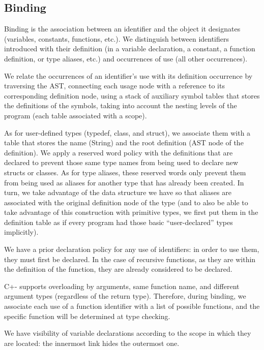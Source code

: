 \documentclass[10pt,a4paper]{article}
\begin{document}
\subsection{Binding}
\label{subsec:Binding}
Binding is the association between an identifier and the object it designates (variables, constants, functions, etc.). We distinguish between identifiers introduced with their definition (in a variable declaration, a constant, a function definition, or type aliases, etc.) and occurrences of use (all other occurrences).


We relate the occurrences of an identifier's use with its definition occurrence by traversing the AST, connecting each usage node with a reference to its corresponding definition node, using a stack of auxiliary symbol tables that stores the definitions of the symbols, taking into account the nesting levels of the program (each table associated with a scope).

As for user-defined types (typedef, class, and struct), we associate them with a table that stores the name (String) and the root definition (AST node of the definition). We apply a reserved word policy with the definitions that are declared to prevent those same type names from being used to declare new structs or classes. As for type aliases, these reserved words only prevent them from being used as aliases for another type that has already been created. In turn, we take advantage of the data structure we have so that aliases are associated with the original definition node of the type (and to also be able to take advantage of this construction with primitive types, we first put them in the definition table as if every program had those basic “user-declared” types implicitly).

We have a prior declaration policy for any use of identifiers: in order to use them, they must first be declared. In the case of recursive functions, as they are within the definition of the function, they are already considered to be declared.

C+- supports overloading by arguments, same function name, and different argument types (regardless of the return type). Therefore, during binding, we associate each use of a function identifier with a list of possible functions, and the specific function will be determined at type checking.

We have visibility of variable declarations according to the scope in which they are located: the innermost link hides the outermost one.
\end{document}
